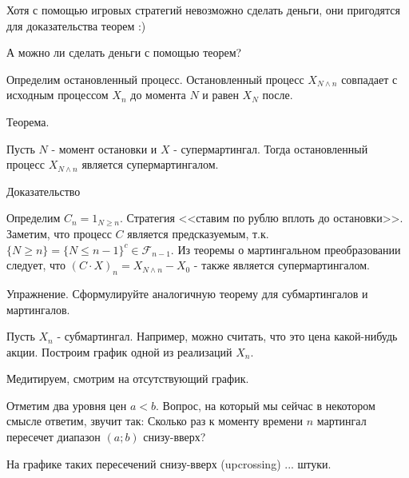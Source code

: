 {Хотя с помощью игровых стратегий невозможно сделать деньги, они
пригодятся для доказательства теорем :) \par
А можно ли сделать деньги с помощью теорем? \par

Определим остановленный процесс. Остановленный процесс $X_{N\wedge
n}$ совпадает с исходным процессом $X_{n}$ до момента $N$ и равен
$X_{N}$ после. \par

Теорема. \par
Пусть $N$ - момент остановки и $X$ - супермартингал. Тогда
остановленный процесс $X_{N\wedge n}$ является супермартингалом. \par

Доказательство \par
Определим $C_{n}=1_{N\ge n}$. Стратегия <<ставим по рублю вплоть до
остановки>>. Заметим, что процесс $C$ является предсказуемым, т.к.
$\{N\ge n\}=\{N\le n-1\}^{c}\in \mathcal{F}_{n-1}$. Из теоремы о
мартингальном преобразовании следует, что $(C\cdot
X)_{n}=X_{N\wedge n}-X_{0}$ - также является
супермартингалом. \par

Упражнение. Сформулируйте аналогичную теорему для субмартингалов и
мартингалов. \par

Пусть $X_{n}$ - субмартингал. Например, можно считать, что это
цена какой-нибудь акции. Построим график одной из
реализаций $X_{n}$. \par
Медитируем, смотрим на отсутствующий график. \par
Отметим два уровня цен $a<b$. Вопрос, на который мы сейчас в
некотором смысле ответим, звучит так: Сколько раз к моменту
времени $n$ мартингал пересечет диапазон $(a;b)$ снизу-вверх? \par
На графике таких пересечений снизу-вверх (upcrossing) ... штуки. \par

}
